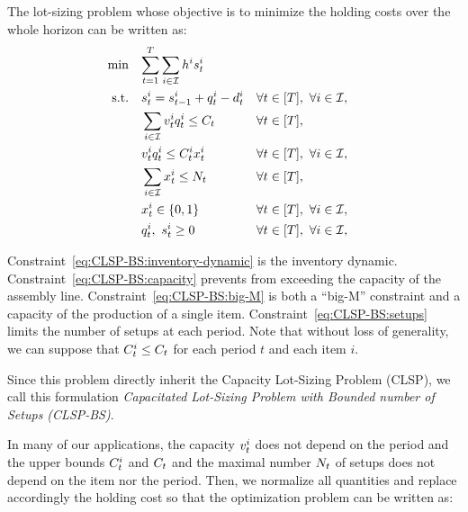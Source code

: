 The lot-sizing problem whose objective is to minimize the holding costs over the whole horizon can be written as:
\begin{subequations}\label{eq:CLSP-BS}
  \begin{align}
    \min\quad & \rlap{$\ds \sum_{t=1}^{\horizon} \sum_{i\in\REF} \holding^i \inventory_t^i$}
    \label{eq:CLSP-BS:objective}
    \\
    \st\quad & \ds \inventory_t^i = \inventory_{t-1}^i + \quantity_t^i - \demand_t^i && \forall t\in\range{\horizon},\ \forall i\in\REF,
    \label{eq:CLSP-BS:inventory-dynamic}
    \\
    & \ds \sum_{i\in\REF} \rate_t^i \quantity_t^i \le \capacity_t && \forall t\in\range{\horizon},
    \label{eq:CLSP-BS:capacity}
    \\
    & \ds \rate_t^i \quantity_t^i \le \capacity_t^i \setup_t^i && \forall t\in\range{\horizon},\ \forall i\in\REF,
    \label{eq:CLSP-BS:big-M}
    \\
    & \ds \sum_{i\in\REF} \setup_t^i \le \nbsetups_t && \forall t\in\range{\horizon},
    \label{eq:CLSP-BS:setups}
    \\
    & \ds \setup_t^i \in \crbracket{0,1} && \forall t\in\range{\horizon},\ \forall i\in\REF,
    \label{eq:CLSP-BS:boolean}
    \\
    & \ds \quantity_t^i,\ \inventory_t^i \ge 0 && \forall t\in\range{\horizon},\ \forall i\in\REF,
    \label{eq:CLSP-BS:positivity}
  \end{align}
\end{subequations}

Constraint~\eqref{eq:CLSP-BS:inventory-dynamic} is the inventory dynamic.
Constraint~\eqref{eq:CLSP-BS:capacity} prevents from exceeding the capacity of the assembly line.
Constraint~\eqref{eq:CLSP-BS:big-M} is both a ``big-M'' constraint and a capacity of the production of a single item.
Constraint~\eqref{eq:CLSP-BS:setups} limits the number of setups at each period.
Note that without loss of generality, we can suppose that $C_t^i \le C_t$ for each period $t$ and each item $i$.

Since this problem directly inherit the Capacity Lot-Sizing Problem (CLSP), we call this formulation \emph{Capacitated Lot-Sizing Problem with Bounded number of Setups (CLSP-BS)}. 


\medskip

In many of our applications, the capacity $v_t^i$ does not depend on the period and the upper bounds $C_t^i$ and $C_t$ and the maximal number $N_t$ of setups does not depend on the item nor the period. Then, we normalize all quantities and replace accordingly the holding cost so that the optimization problem can be written as:

